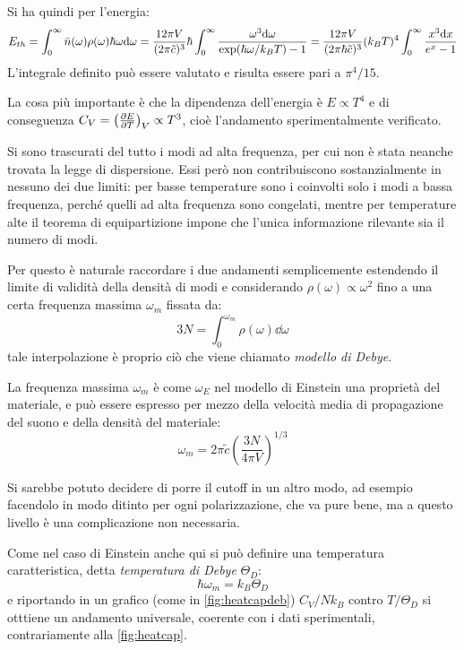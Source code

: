 Si ha quindi per l'energia:
\begin{align*}
	E_{th} = \int_{0}^{\infty} \bar{n}(\omega)\rho(\omega) \hbar \omega \dd \omega = \frac{12\pi V}{(2\pi\tilde{c})^3}\hbar \int_{0}^{\infty} \frac{\omega^3 \dd \omega}{\exp(\hbar\omega/k_B T)-1} = \frac{12\pi V}{(2\pi\hbar\tilde{c})^3} (k_B T)^4 \int_{0}^{\infty} \frac{x^3 \dd x}{e^x -1}
\end{align*}
L'integrale definito può essere valutato e risulta essere pari a $ \pi^4 / 15 $.

La cosa più importante è che la dipendenza dell'energia è $ E \propto T^4 $ e di conseguenza $ C_V = \left(\frac{\partial {E}}{\partial {T}}\right)_{V} \propto T^3$, cioè l'andamento sperimentalmente verificato.
\newline

Si sono trascurati del tutto i modi ad alta frequenza, per cui non è stata neanche trovata la legge di dispersione. Essi però non contribuiscono sostanzialmente in nessuno dei due limiti: per basse temperature sono i coinvolti solo i modi a bassa frequenza, perché quelli ad alta frequenza sono congelati, mentre per temperature alte il teorema di equipartizione impone che l'unica informazione rilevante sia il numero di modi.

Per questo è naturale raccordare i due andamenti semplicemente estendendo il limite di validità della densità di modi e considerando $ \rho(\omega) \propto \omega^2 $ fino a una certa frequenza massima $ \omega_m $ fissata da:
\begin{equation*}
	3N = \int_0^{\omega_m} \rho(\omega) \dd \omega
\end{equation*}
tale interpolazione è proprio ciò che viene chiamato \textit{modello di Debye}.

La frequenza massima $ \omega_m $ è come $ \omega_E $ nel modello di Einstein una proprietà del materiale, e può essere espresso per mezzo della velocità media di propagazione del suono e della densità del materiale:
\begin{equation*}
	\omega_m = 2 \pi \tilde{c} \left(\frac{3N}{4\pi V}\right)^{1/3}
\end{equation*}

Si sarebbe potuto decidere di porre il cutoff in un altro modo, ad esempio facendolo in modo ditinto per ogni polarizzazione, che va pure bene, ma a questo livello è una complicazione non necessaria.

Come nel caso di Einstein anche qui si può definire una temperatura caratteristica, detta \textit{temperatura di Debye} $ \Theta_D $:
\begin{equation*}
\hbar \omega_m = k_B \Theta_D
\end{equation*}
e riportando in un grafico (come in \cref{fig:heatcapdeb}) $ C_V/N k_B $ contro $ T/\Theta_D $ si otttiene un andamento universale, coerente con i dati sperimentali, contrariamente alla \cref{fig:heatcap}.
\newline

